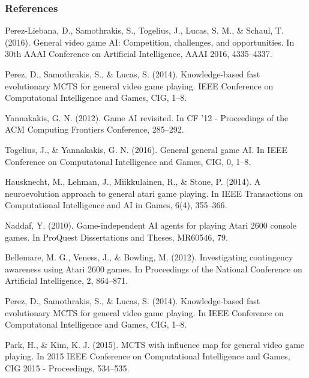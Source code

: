 \documentclass{beamer}
\begin{document}
\begin{frame}[allowframebreaks]
\frametitle{References}
\footnotesize{
\begin{thebibliography}{99} %
    Perez-Liebana, D., Samothrakis, S., Togelius, J., Lucas, S. M., \& Schaul, T. (2016). 
    \newblock General video game AI: Competition, challenges, and opportunities. 
    \newblock In 30th AAAI Conference on Artificial Intelligence, AAAI 2016, 4335–4337.

    Perez, D., Samothrakis, S., \& Lucas, S. (2014). 
    \newblock Knowledge-based fast evolutionary MCTS for general video game playing.
    \newblock IEEE Conference on Computatonal Intelligence and Games, CIG, 1–8.


    Yannakakis, G. N. (2012). 
    \newblock Game AI revisited.
    \newblock In CF ’12 - Proceedings of the ACM Computing Frontiers Conference, 285–292.

    Togelius, J., \& Yannakakis, G. N. (2016). 
    \newblock General general game AI. 
    \newblock In IEEE Conference on Computatonal Intelligence and Games, CIG, 0, 1–8.

    Hausknecht, M., Lehman, J., Miikkulainen, R., \& Stone, P. (2014). 
    \newblock A neuroevolution approach to general atari game playing. 
    \newblock In IEEE Transactions on Computational Intelligence and AI in Games, 6(4), 355–366.

    Naddaf, Y. (2010). 
    \newblock Game-independent AI agents for playing Atari 2600 console games.
    \newblock In ProQuest Dissertations and Theses, MR60546, 79.

    Bellemare, M. G., Veness, J., \& Bowling, M. (2012). 
    \newblock Investigating contingency awareness using Atari 2600 games. 
    \newblock In Proceedings of the National Conference on Artificial Intelligence, 2, 864–871.

    Perez, D., Samothrakis, S., \& Lucas, S. (2014).
    \newblock Knowledge-based fast evolutionary MCTS for general video game playing. 
    \newblock In IEEE Conference on Computatonal Intelligence and Games, CIG, 1–8.

    Park, H., \& Kim, K. J. (2015). 
    \newblock MCTS with influence map for general video game playing. 
    \newblock In 2015 IEEE Conference on Computational Intelligence and Games, CIG 2015 - Proceedings, 534–535.


\end{thebibliography}}
\end{frame}
\end{document}
